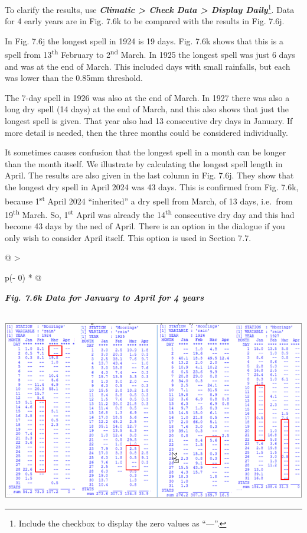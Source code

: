 \documentclass[
  letterpaper,
  DIV=11,
  numbers=noendperiod]{scrreprt}
\begin{document}
To clarify the results, use \textbf{\emph{Climatic \textgreater{} Check
Data \textgreater{} Display Daily}}\footnote{Include the checkbox to
  display the zero values as ``---''.}. Data for 4 early years are in
Fig. 7.6k to be compared with the results in Fig. 7.6j.

In Fig. 7.6j the longest spell in 1924 is 19 days. Fig. 7.6k shows that
this is a spell from 13\textsuperscript{th} February to
2\textsuperscript{nd} March. In 1925 the longest spell was just 6 days
and was at the end of March. This included days with small rainfalls,
but each was lower than the 0.85mm threshold.

The 7-day spell in 1926 was also at the end of March. In 1927 there was
also a long dry spell (14 days) at the end of March, and this also shows
that just the longest spell is given. That year also had 13 consecutive
dry days in January. If more detail is needed, then the three months
could be considered individually.

It sometimes causes confusion that the longest spell in a month can be
longer than the month itself. We illustrate by calculating the longest
spell length in April. The results are also given in the last column in
Fig. 7.6j. They show that the longest dry spell in April 2024 was 43
days. This is confirmed from Fig. 7.6k, because 1\textsuperscript{st}
April 2024 ``inherited'' a dry spell from March, of 13 days, i.e.~from
19\textsuperscript{th} March. So, 1\textsuperscript{st} April was
already the 14\textsuperscript{th} consecutive dry day and this had
become 43 days by the ned of April. There is an option in the dialogue
if you only wish to consider April itself. This option is used in
Section 7.7.

\begin{longtable}[]{@{}
  >{\raggedright\arraybackslash}p{(\columnwidth - 0\tabcolsep) * }@{}}
\toprule\noalign{}
\begin{minipage}[b]{\linewidth}\raggedright
\textbf{\emph{Fig. 7.6k Data for January to April for 4 years}}
\end{minipage} \\
\midrule\noalign{}
\endhead
\bottomrule\noalign{}
\endlastfoot
\includegraphics[width=5.98585in,height=3.0798in]{figures/Fig7.6k.png} \\
\end{longtable}
\end{document}

